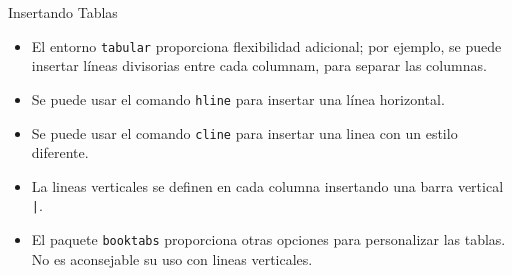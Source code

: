 \documentclass[12pt]{beamer}
\begin{document}
\begin{frame}{Insertando Tablas}
  \begin{itemize}
    \item<1-> El entorno \texttt{\color{blue}tabular} proporciona flexibilidad adicional; por ejemplo, se puede insertar líneas divisorias entre cada columnam, para separar las columnas.
    \item <2-> Se puede usar el comando \texttt{\color{blue}hline} para insertar una línea horizontal.
    \item <3-> Se puede usar el comando \texttt{\color{blue}cline} para insertar una linea con un estilo diferente.
    \item <4-> La lineas verticales se definen en cada columna insertando una barra vertical \texttt{\color{blue}|}.
    \item <5-> El paquete \texttt{\color{blue}booktabs} proporciona otras opciones para personalizar las tablas. No es aconsejable su uso con lineas verticales.
  \end{itemize}  
\end{frame}
\end{document}
